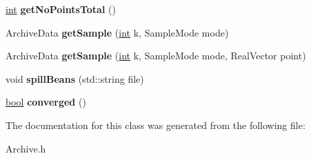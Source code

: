 \begin{DoxyCompactItemize}
\item 
\hyperlink{classint}{int} {\bfseries get\+No\+Points\+Total} ()\hypertarget{classArchive_aa3f728c42f4b726ef412395b8fe50db6}{}\label{classArchive_aa3f728c42f4b726ef412395b8fe50db6}

\item 
Archive\+Data {\bfseries get\+Sample} (\hyperlink{classint}{int} k, Sample\+Mode mode)\hypertarget{classArchive_a57fe2aba7bb8561400c7d02ccae07c49}{}\label{classArchive_a57fe2aba7bb8561400c7d02ccae07c49}

\item 
Archive\+Data {\bfseries get\+Sample} (\hyperlink{classint}{int} k, Sample\+Mode mode, Real\+Vector point)\hypertarget{classArchive_ad7f54ab78632d3ed28b43873ba33cc63}{}\label{classArchive_ad7f54ab78632d3ed28b43873ba33cc63}

\item 
void {\bfseries spill\+Beans} (std\+::string file)\hypertarget{classArchive_ad172546cc2380b336f6784156364ff38}{}\label{classArchive_ad172546cc2380b336f6784156364ff38}

\item 
\hyperlink{classbool}{bool} {\bfseries converged} ()\hypertarget{classArchive_a7a7d1cae48fb19bed9c3e96a62dd5e2e}{}\label{classArchive_a7a7d1cae48fb19bed9c3e96a62dd5e2e}

\end{DoxyCompactItemize}


The documentation for this class was generated from the following file\+:\begin{DoxyCompactItemize}
\item 
Archive.\+h\end{DoxyCompactItemize}
